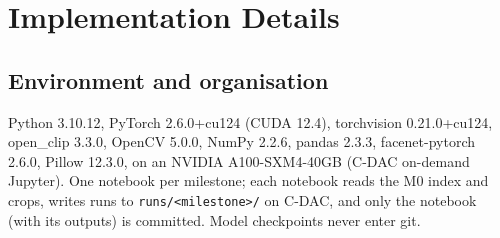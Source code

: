 \documentclass[10pt,a4paper]{article}
\begin{document}
\section{Implementation Details}\label{sec:impl}

\subsection{Environment and organisation}
Python 3.10.12, PyTorch 2.6.0+cu124 (CUDA 12.4), torchvision 0.21.0+cu124, open\_clip 3.3.0,
OpenCV 5.0.0, NumPy 2.2.6, pandas 2.3.3, facenet-pytorch 2.6.0, Pillow 12.3.0, on an NVIDIA
A100-SXM4-40GB (C-DAC on-demand Jupyter). One notebook per milestone; each notebook reads the M0
index and crops, writes runs to \texttt{runs/<milestone>/} on C-DAC, and only the notebook (with its
outputs) is committed. Model checkpoints never enter git.
\end{document}
